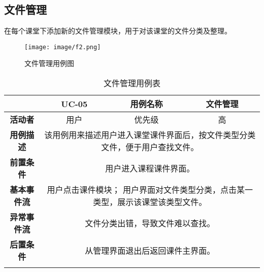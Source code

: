 \subsection{文件管理}

在每个课堂下添加新的文件管理模块，用于对该课堂的文件分类及整理。

\begin{figure}[!htb]
	\centering\label{fig:fig2}
	\texttt{[image: image/f2.png]}
	\caption{文件管理用例图}
\end{figure}

\begin{longtable}[c]{c|ccc}
	\caption{文件管理用例表}
	\label{tab:tab5}\\
	\shline
	\multicolumn{1}{c|}{\textbf{用例编号}} & \multicolumn{1}{c|}{UC-05} & \multicolumn{1}{c|}{用例名称} &  文件管理\\ \hline
	\endhead
	\multicolumn{1}{c|}{\textbf{活动者}} & \multicolumn{1}{c|}{用户} & \multicolumn{1}{c|}{优先级} &高  \\ \hline
	\textbf{用例描述} & \multicolumn{3}{p{12cm}}{该用例用来描述用户进入课堂课件界面后，按文件类型分类文件，便于用户查找文件。} \\ \hline
	\textbf{前置条件}& \multicolumn{3}{p{12cm}}{用户进入课程课件界面。} \\ \hline
	\textbf{基本事件流}& \multicolumn{3}{p{12cm}}{用户点击课件模块；\newline
	用户界面对文件类型分类，点击某一类型，展示该课堂该类型文件。
	} \\ \hline
	\textbf{异常事件流}& \multicolumn{3}{p{12cm}}{文件分类出错，导致文件难以查找。
	} \\ \hline
	\textbf{后置条件}& \multicolumn{3}{p{12cm}}{从管理界面退出后返回课件主界面。} \\ \shline
\end{longtable}

